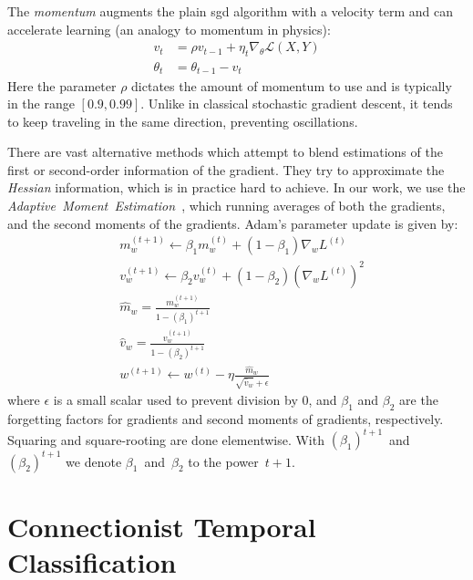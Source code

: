 The \textit{momentum} augments the plain \acrshort{sgd} algorithm with a velocity term and can
accelerate learning (an analogy to momentum in physics):
\begin{align}
    v_t &= \rho v_{t-1} + \eta_t \nabla_{\theta} \mathcal{L}(X, Y) \\
    \theta_t &= \theta_{t-1} - v_t
\end{align}
Here the parameter $\rho$ dictates the amount of momentum to use and is
typically in the range $[0.9, 0.99]$.
Unlike in classical stochastic gradient descent, it tends to keep traveling in
the same direction, preventing oscillations.

There are vast alternative methods which attempt to blend estimations
of the first or second-order information of the gradient.
They try to approximate the \textit{Hessian} information, which is in practice hard to achieve.
In our work, we use the \textit{Adaptive~Moment~Estimation}~\cite{kingma2014}, which running averages of both the gradients,
and the second moments of the gradients.
Adam's parameter update is given by:
\begin{align}
    & m_{w}^{(t+1)} \leftarrow \beta_{1} m_{w}^{(t)}+(1-\beta_{1})\nabla_{w}L^{(t)}               \\[5pt]
    & v_{w}^{(t+1)}\leftarrow \beta _{2} v_{w}^{(t)}+(1-\beta_{2})(\nabla_{w}L^{(t)})^{2}         \\[5pt]
    & \hat{m}_w = \frac {m_{w}^{(t+1)}}{1-(\beta_{1})^{t+1}}                                      \\[5pt]
    & \hat{v}_w = \frac {v_{w}^{(t+1)}}{1-(\beta_{2})^{t+1}}                                      \\[5pt]
    & w^{(t+1)} \leftarrow w^{(t)} - \eta \frac{\hat{m}_w}{\sqrt{\hat{v}_w}+\epsilon}
\end{align}
where $\epsilon$ is a small scalar used to prevent division by 0, and $\beta_1$ and $\beta _{2}$
are the forgetting factors for gradients and second moments of gradients, respectively.
Squaring and square-rooting are done elementwise.
With $(\beta_1)^{t+1}$~and~$(\beta_2)^{t+1}$ we denote $\beta_1$~and~$\beta_2$ to the power~$t+1$.


\section{Connectionist Temporal Classification}\label{sec:connectionist-temporal-classification}

